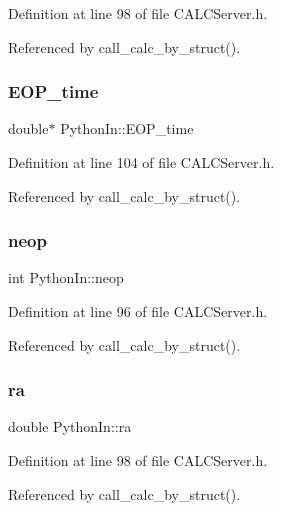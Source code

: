 Definition at line 98 of file C\+A\+L\+C\+Server.\+h.



Referenced by call\+\_\+calc\+\_\+by\+\_\+struct().

\mbox{\label{struct_python_in_a497f34dbe6fa656e9bc4b46b1c88d17e}} 
\subsubsection{\texorpdfstring{E\+O\+P\+\_\+time}{EOP\_time}}
{\footnotesize\ttfamily double$\ast$ Python\+In\+::\+E\+O\+P\+\_\+time}



Definition at line 104 of file C\+A\+L\+C\+Server.\+h.



Referenced by call\+\_\+calc\+\_\+by\+\_\+struct().

\mbox{\label{struct_python_in_a4acfd5268f99a241fa78115e7fdedf37}} 
\subsubsection{\texorpdfstring{neop}{neop}}
{\footnotesize\ttfamily int Python\+In\+::neop}



Definition at line 96 of file C\+A\+L\+C\+Server.\+h.



Referenced by call\+\_\+calc\+\_\+by\+\_\+struct().

\mbox{\label{struct_python_in_a156e0b7dd55afb31b9f80be79f1ffc6c}} 
\subsubsection{\texorpdfstring{ra}{ra}}
{\footnotesize\ttfamily double Python\+In\+::ra}



Definition at line 98 of file C\+A\+L\+C\+Server.\+h.



Referenced by call\+\_\+calc\+\_\+by\+\_\+struct().

